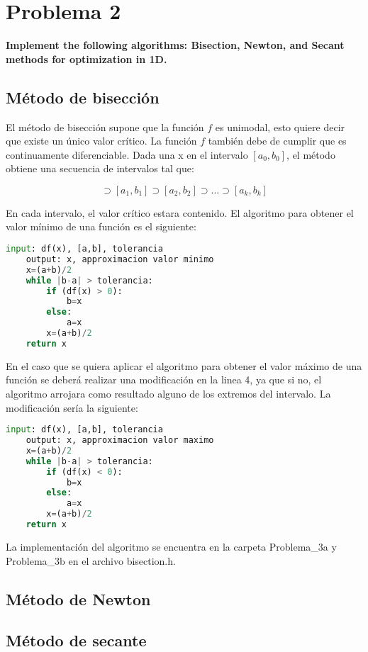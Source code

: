 \section*{Problema 2}
\textbf{Implement the following algorithms: Bisection, Newton, and Secant methods for optimization in 1D.}

\subsection*{Método de bisección}

El método de bisección supone que la función $f$ es unimodal, esto quiere decir que existe un único valor crítico. La función $f$ también debe de cumplir que es continuamente diferenciable. Dada una x en el intervalo $[a_0,b_0]$, el método obtiene una secuencia de intervalos tal que:

\begin{equation*}
    [a_0,b_0]\supset [a_1,b_1]\supset [a_2,b_2] \supset \dots \supset [a_k,b_k]
\end{equation*}

En cada intervalo, el valor crítico estara contenido. El algoritmo para obtener el valor mínimo de una función es el siguiente:
\begin{lstlisting}[language=python]
    input: df(x), [a,b], tolerancia
    output: x, approximacion valor minimo
    x=(a+b)/2
    while |b-a| > tolerancia:
        if (df(x) > 0):
            b=x
        else:
            a=x
        x=(a+b)/2
    return x
\end{lstlisting}

En el caso que se quiera aplicar el algoritmo para obtener el valor máximo de una función se deberá realizar una modificación en la linea 4, ya que si no, el algoritmo arrojara como resultado alguno de los extremos del intervalo. La modificación sería la siguiente:

\begin{lstlisting}[language=python]
    input: df(x), [a,b], tolerancia
    output: x, approximacion valor maximo
    x=(a+b)/2
    while |b-a| > tolerancia:
        if (df(x) < 0):
            b=x
        else:
            a=x
        x=(a+b)/2
    return x
\end{lstlisting}

La implementación del algoritmo se encuentra en la carpeta \textcolor{title}{Problema\_3a} y \textcolor{title}{Problema\_3b} en el archivo \textcolor{citecolor}{bisection.h}.

\subsection*{Método de Newton}
\subsection*{Método de secante}